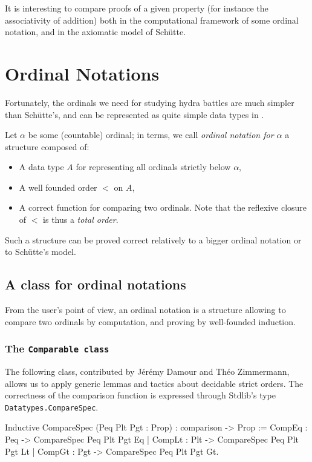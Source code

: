 It is interesting to compare proofs of a given property (for instance the associativity of addition) both in the computational framework of some ordinal notation, and in the axiomatic model of Schütte.

\section{Ordinal Notations}


Fortunately, the ordinals we need for  studying hydra battles are much simpler than Schütte's, and can be represented as quite simple data types in \gallina. 

Let $\alpha$ be some (countable) ordinal; 
in \coq{} terms, we call \emph{ordinal notation for $\alpha$} a structure composed 
of:
\begin{itemize}
\item A data type $A$ for representing all ordinals strictly below $\alpha$,
\item A well founded order $<$ on $A$, 
\item A correct function for comparing two ordinals. Note  that the reflexive closure of $<$ is thus a \emph{total order}.
\end{itemize}


Such a structure can be proved correct relatively to a bigger ordinal notation or
to Schütte's model.





\subsection{A class for ordinal notations}

From the \coq{} user's point of view, an ordinal notation is
a structure allowing to compare two ordinals by computation, and proving by well-founded induction.

\subsubsection{The \texttt{Comparable class}}

The following class, contributed by Jérémy Damour and Théo Zimmermann, allows us to apply generic lemmas and tactics
about decidable strict orders.
The correctness of the comparison function is expressed through Stdlib's type 
\texttt{Datatypes.CompareSpec}.


\begin{Coqsrc}
Inductive CompareSpec (Peq Plt Pgt : Prop) : comparison -> Prop :=
    CompEq : Peq -> CompareSpec Peq Plt Pgt Eq
  | CompLt : Plt -> CompareSpec Peq Plt Pgt Lt
  | CompGt : Pgt -> CompareSpec Peq Plt Pgt Gt.
\end{Coqsrc}

